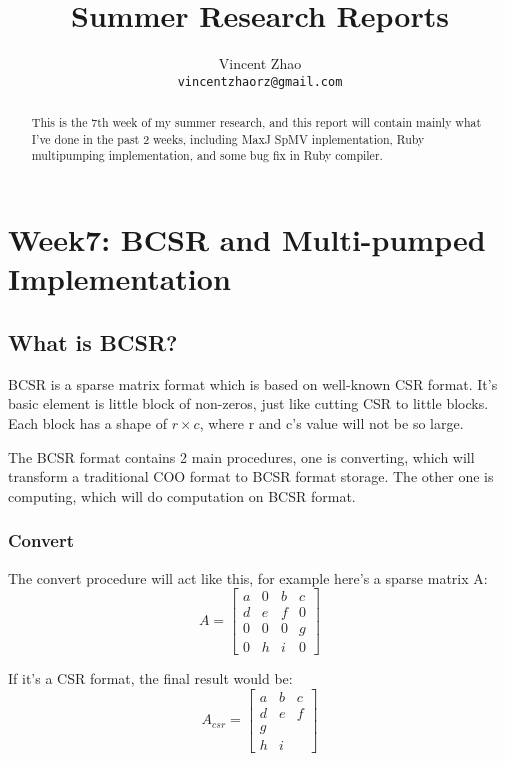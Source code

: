 \documentclass[a4paper, 10pt]{article}
\begin{document}
\title{Summer Research Reports}
\author{Vincent Zhao\\
		\texttt{vincentzhaorz@gmail.com}}
\maketitle

\begin{abstract}
This is the 7th week of my summer research, and this report will contain mainly what I've done in the past 2 weeks, including MaxJ SpMV inplementation, Ruby multipumping implementation, and some bug fix in Ruby compiler.
\end{abstract}
\newpage

\tableofcontents

\newpage


\section{Week7: BCSR and Multi-pumped Implementation}

\subsection{What is BCSR?}
BCSR is a sparse matrix format which is based on well-known CSR format. It's basic element is little block of non-zeros, just like cutting CSR to little blocks. Each block has a shape of $r \times c$, where r and c's value will not be so large. 

The BCSR format contains 2 main procedures, one is converting, which will transform a traditional COO format to BCSR format storage. The other one is computing, which will do computation on BCSR format.

\subsubsection{Convert}
The convert procedure will act like this, for example here's a sparse matrix A:
\[
A = 
\begin{bmatrix}
	a & 0 & b & c \\
	d & e & f & 0 \\
	0 & 0 & 0 & g \\
	0 & h & i & 0
\end{bmatrix}
\]

If it's a CSR format, the final result would be:
\[
A_{csr} = 
\begin{bmatrix}
	a & b & c \\
	d & e & f \\
	g \\
	h & i
\end{bmatrix}
\]
\end{document}
